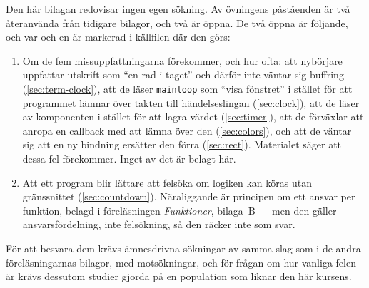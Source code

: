 Den här bilagan redovisar ingen egen sökning.  Av övningens
 påståenden är två återanvända från tidigare
bilagor,
och två är öppna.  De två öppna är
följande, och var och en är markerad i källfilen där den görs:
\begin{enumerate}
  \item Om de fem missuppfattningarna förekommer, och hur ofta: att nybörjare
    uppfattar utskrift som \enquote{en rad i taget} och därför inte
    väntar sig buffring (\cref{sec:term-clock}), att de läser
    \texttt{mainloop} som \enquote{visa fönstret} i stället
    för att programmet lämnar över takten till händelseslingan
    (\cref{sec:clock}), att
    de läser av komponenten i stället för att lagra värdet
    (\cref{sec:timer}), att de förväxlar att anropa en
    \foreignlanguage{english}{callback} med att lämna över den
    (\cref{sec:colors}), och att de väntar sig att en ny bindning
    ersätter den förra (\cref{sec:rect}).  Materialet säger att dessa
    fel förekommer.  Inget av det är belagt här.
  \item Att ett program blir lättare att felsöka om logiken kan köras
    utan gränssnittet (\cref{sec:countdown}).  Näraliggande är
    principen om ett ansvar per funktion, belagd i föreläsningen
    \emph{Funktioner}, bilaga~B --- men den gäller ansvarsfördelning,
    inte felsökning, så den räcker inte som svar.
\end{enumerate}
För att besvara dem krävs ämnesdrivna sökningar av samma slag som i de
andra föreläsningarnas bilagor, med motsökningar, och för frågan om hur
vanliga felen är krävs dessutom studier gjorda på en population som
liknar den här kursens.
